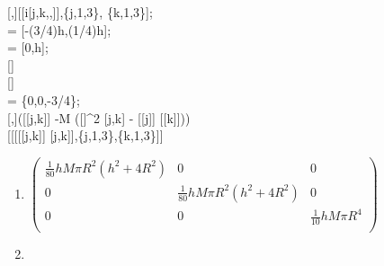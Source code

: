 \documentclass[10pt]{article}
\begin{document}
\begin{enumerate}
\begin{enumerate}
{        [,]\text{:=}[[i[j,k,,]],\{j,1,3\}, \{k,1,3\}];\\
         = [-(3/4)h,(1/4)h];\\
         = [0,h];\\
        []\\
        []\\
         = \{0,0,-3/4\};\\
        [,]\text{:=}([[j,k]] -M ([]{}^{\wedge}2 [j,k] - [[j]]
        [[k]]))\\
        [[[[[j,k]] \text{==} [j,k]],\{j,1,3\},\{k,1,3\}]]
      }
      \begin{enumerate}
        \item\begin{doublespace}
               \noindent\(\left(
               \begin{array}{ccc}
                 \frac{1}{80} h M \pi  R^2 \left(h^2+4 R^2\right) & 0                                              & 0                       \\
                 0                                              & \frac{1}{80} h M \pi  R^2 \left(h^2+4 R^2\right) & 0                       \\
                 0                                              & 0                                              & \frac{1}{10} h M \pi  R^4 \\
               \end{array}
               \right)\)
        \end{doublespace}
        \item{}
\end{enumerate}
\end{enumerate}
\end{enumerate}
\end{document}
